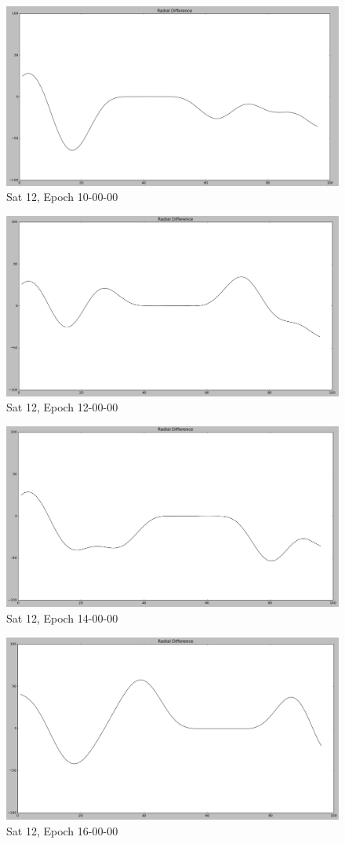 \documentclass[12pt,a4paper]{article}
\begin{document}
	\begin{figure}[H]
	\centering
	\includegraphics[width=0.6\linewidth]{"images/12 - 10"}
	\caption{Sat 12, Epoch 10-00-00}
	\label{fig:12-10}
	\end{figure}
	\begin{figure}[H]
	\centering
	\includegraphics[width=0.6\linewidth]{"images/12 - 12"}
	\caption{Sat 12, Epoch 12-00-00}
	\label{fig:12-12}
	\end{figure}
	\begin{figure}[H]
	\centering
	\includegraphics[width=0.6\linewidth]{"images/12 - 14"}
	\caption{Sat 12, Epoch 14-00-00}
	\label{fig:12-14}
	\end{figure}
	\begin{figure}[H]
	\centering
	\includegraphics[width=0.6\linewidth]{"images/12 - 16"}
	\caption{Sat 12, Epoch 16-00-00}
	\label{fig:12-16}
	\end{figure}
\end{document}
